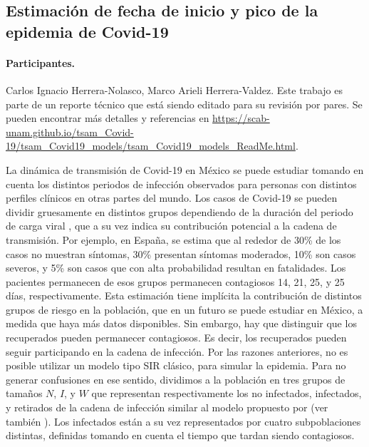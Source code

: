 
\subsection*{Estimación de fecha de inicio y pico de la epidemia de Covid-19}
\paragraph{Participantes.} Carlos Ignacio Herrera-Nolasco, Marco Arieli Herrera-Valdez. Este trabajo es parte de un reporte técnico que está siendo editado para su revisión por pares. Se pueden encontrar más detalles y referencias en \url{https://scab-unam.github.io/tsam_Covid-19/tsam_Covid19_models/tsam_Covid19_models_ReadMe.html}.

La dinámica de transmisión de Covid-19 en México se puede estudiar tomando en cuenta los distintos periodos de infección observados para personas con distintos perfiles clínicos en otras partes del mundo. 
Los casos de Covid-19 se pueden dividir gruesamente en distintos grupos dependiendo de la duración del periodo de carga viral \citep{zhou2020clinical}, que a su vez indica su contribución potencial a la cadena de transmisión. Por ejemplo, en España, se estima que al rededor de 30\% de los casos no muestran síntomas, 30\% presentan síntomas moderados, 10\% son casos severos, y 5\% son casos que con alta probabilidad resultan en fatalidades.  Los pacientes permanecen de esos grupos permanecen contagiosos 14, 21, 25, y 25 días, respectivamente.  
Esta estimación tiene implícita la contribución de distintos grupos de riesgo en la población, que en un futuro se puede estudiar en México, a medida que haya más datos disponibles. 
Sin embargo, hay que distinguir que los recuperados pueden permanecer contagiosos. Es decir, los recuperados pueden seguir participando en la cadena de infección. Por las razones anteriores, no es posible utilizar un modelo tipo SIR clásico, para simular la epidemia. Para no generar confusiones en ese sentido, dividimos a la población en tres grupos de tamaños $N$, $I$, y $W$ que representan respectivamente los no infectados, infectados, y retirados de la cadena de infección similar al modelo propuesto por \cite{herrera2020tesis} (ver también \cite{herrera2020pNIW}). Los infectados están a su vez representados por cuatro subpoblaciones distintas, definidas tomando en cuenta el tiempo que tardan siendo contagiosos. 


